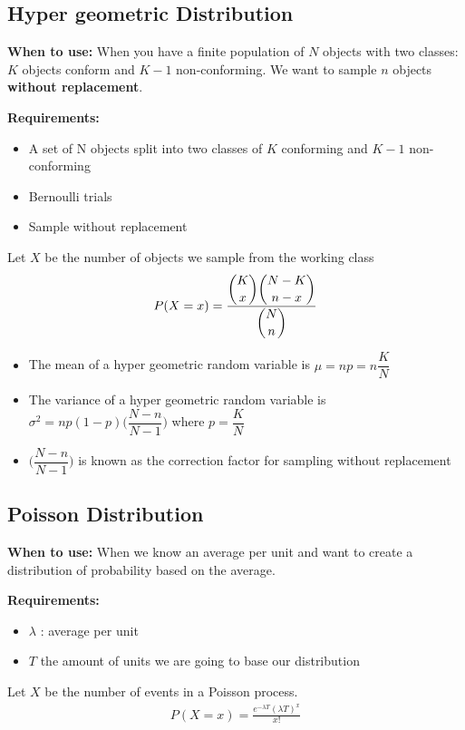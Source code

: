 \documentclass[12pt, titlepage, oneside]{article}
\renewcommand{\b}[1]{\textbf{#1}}
\begin{document}
      \subsection{Hyper geometric Distribution}
      \b{When to use:} When you have a finite population of $N$ objects with two classes: $K$ objects conform and $K-1$ non-conforming. We want to sample $n$ objects \b{without replacement}.

      \b{Requirements:}
      \begin{itemize}
        \item A set of N objects split into two classes of $K$ conforming and $K-1$ non-conforming
        \item Bernoulli trials
        \item Sample without replacement
      \end{itemize}

      Let $X$ be the number of objects we sample from the working class
      \begin{align}
        P(X = x) = \dfrac{ \dbinom{K}{x} \dbinom{N-K}{n-x}}{\dbinom{N}{n}}
        \end{align}
        \begin{itemize}
          \item The mean of a hyper geometric random variable is $\mu = n p = n \dfrac{K}{N}$
          \item The variance of a hyper geometric random variable is $\sigma^2 = np(1-p)\bigg(\dfrac{N-n}{N-1}\bigg)$ where $p = \dfrac{K}{N}$
          \item $\bigg(\dfrac{N-n}{N-1}\bigg)$ is known as the correction factor for sampling without replacement
        \end{itemize}

        \subsection{Poisson Distribution}
        \b{When to use:} When we know an average per unit and want to create a distribution of probability based on the average.

        \b{Requirements:}
        \begin{itemize}
          \item $\lambda$ : average per unit
          \item $T$ the amount of units we are going to base our distribution
          \end{itemize}

          Let $X$ be the number of events in a Poisson process.
        \begin{align}
          P(X = x) = \frac{e^{-\lambda T}(\lambda T)^x}{x!}
          \end{align}

        
    
\end{document}
